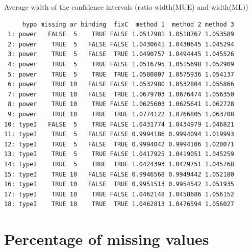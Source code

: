 \documentclass[12pt]{article}
\begin{document}
Average width of the confidence intervals (ratio width(MUE) and width(ML))
\begin{verbatim}
     hypo missing ar binding  fixC  method 1  method 2 method 3
 1: power   FALSE  5    TRUE FALSE 1.0517981 1.0518767 1.053589
 2: power    TRUE  5   FALSE FALSE 1.0430641 1.0430645 1.045294
 3: power    TRUE  5   FALSE  TRUE 1.0490757 1.0494445 1.045526
 4: power    TRUE  5    TRUE FALSE 1.0516795 1.0515698 1.052909
 5: power    TRUE  5    TRUE  TRUE 1.0580807 1.0575936 1.054137
 6: power    TRUE 10   FALSE FALSE 1.0532980 1.0532804 1.055866
 7: power    TRUE 10   FALSE  TRUE 1.0679703 1.0676474 1.056350
 8: power    TRUE 10    TRUE FALSE 1.0625603 1.0625641 1.062728
 9: power    TRUE 10    TRUE  TRUE 1.0774122 1.0766805 1.063708
10: typeI   FALSE  5    TRUE FALSE 1.0431774 1.0434979 1.046821
11: typeI    TRUE  5   FALSE FALSE 0.9994186 0.9994094 1.019993
12: typeI    TRUE  5   FALSE  TRUE 0.9994042 0.9994106 1.020071
13: typeI    TRUE  5    TRUE FALSE 1.0417925 1.0419051 1.045259
14: typeI    TRUE  5    TRUE  TRUE 1.0424393 1.0429751 1.045768
15: typeI    TRUE 10   FALSE FALSE 0.9946568 0.9949442 1.052180
16: typeI    TRUE 10   FALSE  TRUE 0.9951513 0.9954542 1.051935
17: typeI    TRUE 10    TRUE FALSE 1.0462148 1.0458686 1.056152
18: typeI    TRUE 10    TRUE  TRUE 1.0462813 1.0476594 1.056027
\end{verbatim}

\section{Percentage of missing values}
\label{sec:org4cba011}
\end{document}
